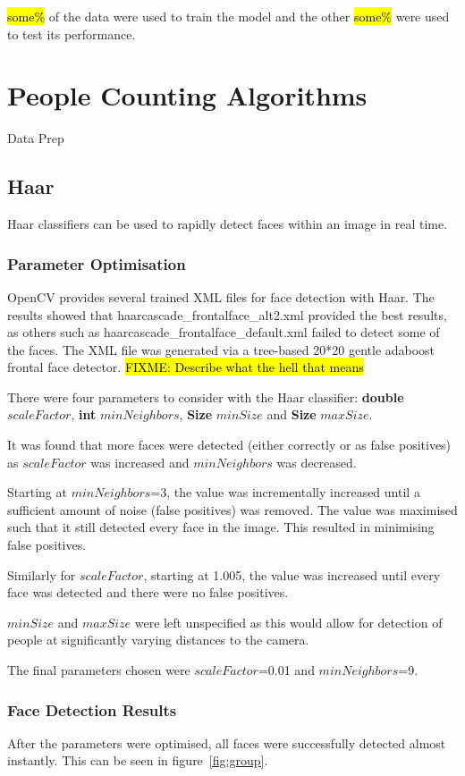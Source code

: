 \documentclass{article}
\begin{document}
\hl{some\%} of the data were used to train the model and the other \hl{some\%} were used to test its performance.

\section{People Counting Algorithms}
Data Prep

\subsection{Haar}
Haar classifiers can be used to rapidly detect faces within an image in real time.


\subsubsection{Parameter Optimisation}
OpenCV provides several trained XML files for face detection with Haar. The results showed that haarcascade\_frontalface\_alt2.xml provided the best results, as others such as haarcascade\_frontalface\_default.xml failed to detect some of the faces. The XML file was generated via a tree-based 20*20 gentle adaboost frontal face detector. \hl{FIXME: Describe what the hell that means}

There were four parameters to consider with the Haar classifier: \textbf{double} $scaleFactor$, \textbf{int} $minNeighbors$, \textbf{Size} $minSize$ and \textbf{Size} $maxSize$.

It was found that more faces were detected (either correctly or as false positives) as $scaleFactor$ was increased and $minNeighbors$ was decreased.

Starting at $minNeighbors$=3, the value was incrementally increased until a sufficient amount of noise (false positives) was removed. The value was maximised such that it still detected every face in the image. This resulted in minimising false positives.

Similarly for $scaleFactor$, starting at 1.005, the value was increased until every face was detected and there were no false positives.

$minSize$ and $maxSize$ were left unspecified as this would allow for detection of people at significantly varying distances to the camera.

The final parameters chosen were $scaleFactor$=0.01 and $minNeighbors$=9.

\subsubsection{Face Detection Results}
After the parameters were optimised, all faces were successfully detected almost instantly. This can be seen in figure~\ref{fig:group}.
\end{document}
